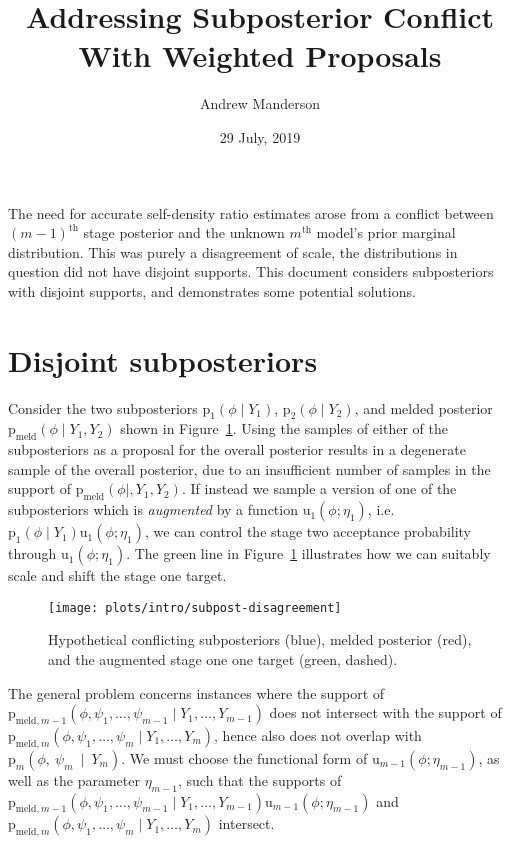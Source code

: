 \documentclass[10pt,a4paper,]{article}
\title{Addressing Subposterior Conflict With Weighted Proposals}
\author{Andrew Manderson}
\date{29 July, 2019}
\newcommand{\pd}{\text{p}}
\newcommand{\pmeld}{\pd_{\text{meld}}}
\newcommand{\tarw}{\text{u}}
\newcommand{\modelindex}{m}
\begin{document}
\maketitle

The need for accurate self-density ratio estimates arose from a conflict
between \((m - 1)^{\text{th}}\) stage posterior and the unknown
\(m^{\text{th}}\) model's prior marginal distribution. This was purely a
disagreement of scale, the distributions in question did not have
disjoint supports. This document considers subposteriors with disjoint
supports, and demonstrates some potential solutions.

\section{Disjoint subposteriors}\label{disjoint-subposteriors}

Consider the two subposteriors \(\pd_{1}(\phi \mid Y_{1})\),
\(\pd_{2}(\phi \mid Y_{2})\), and melded posterior
\(\pmeld(\phi \mid Y_{1}, Y_{2})\) shown in
Figure~\ref{fig:subpost_disagreement}. Using the samples of either of
the subposteriors as a proposal for the overall posterior results in a
degenerate sample of the overall posterior, due to an insufficient
number of samples in the support of \(\pmeld(\phi \mid, Y_{1}, Y_{2})\).
If instead we sample a version of one of the subposteriors which is
\emph{augmented} by a function \(\tarw_{1}(\phi; \eta_{1})\),
i.e.~\(\pd_{1}(\phi \mid Y_{1})\tarw_{1}(\phi; \eta_{1})\), we can
control the stage two acceptance probability through
\(\tarw_{1}(\phi; \eta_{1})\). The green line in
Figure~\ref{fig:subpost_disagreement} illustrates how we can suitably
scale and shift the stage one target.

\begin{figure}

{\centering \texttt{[image: plots/intro/subpost-disagreement]} 

}

\caption{Hypothetical conflicting subposteriors (blue), melded posterior (red), and the augmented stage one one target (green, dashed).}\label{fig:subpost_disagreement}
\end{figure}

The general problem concerns instances where the support of
\(\pd_{\text{meld}, \modelindex - 1}(\phi, \psi_{1}, \ldots, \psi_{\modelindex - 1} \mid Y_{1}, \ldots, Y_{\modelindex - 1})\)
does not intersect with the support of
\(\pd_{\text{meld}, \modelindex}(\phi, \psi_{1}, \ldots, \psi_{\modelindex} \mid Y_{1}, \ldots, Y_{\modelindex})\),
hence also does not overlap with
\(\pd_{\modelindex}(\phi,~\psi_{\modelindex}~\mid~Y_{\modelindex})\). We
must choose the functional form of
\(\tarw_{\modelindex - 1}(\phi; \eta_{\modelindex - 1})\), as well as
the parameter \(\eta_{\modelindex - 1}\), such that the supports of
\(\pd_{\text{meld}, \modelindex - 1}(\phi, \psi_{1}, \ldots, \psi_{\modelindex - 1} \mid Y_{1}, \ldots, Y_{\modelindex - 1})\tarw_{\modelindex - 1}(\phi; \eta_{\modelindex - 1})\)
and
\(\pd_{\text{meld}, \modelindex}(\phi, \psi_{1}, \ldots, \psi_{\modelindex} \mid Y_{1}, \ldots, Y_{\modelindex})\)
intersect.
\end{document}
